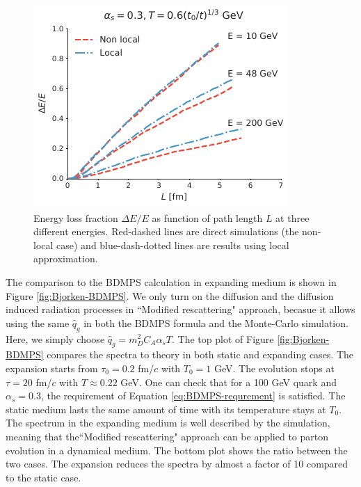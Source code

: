 \documentclass[aps, prc, reprint, amsmath, groupedaddress, nofootinbib]{revtex4-1}
\begin{document}
{\begin{figure}
\includegraphics[width=\columnwidth]{Bjorken.pdf}
\caption{Energy loss fraction $\Delta E /E$ as function of path length $L$ at three different energies. Red-dashed lines are direct simulations (the non-local case) and blue-dash-dotted lines are results using local approximation.}
\label{fig:Bjorken}
\end{figure}


The comparison to the BDMPS calculation in expanding medium is shown in Figure \ref{fig:Bjorken-BDMPS}.
We only turn on the diffusion and the diffusion induced radiation  processes in ``Modified rescattering" approach, becasue it allows using the same $\hat{q}_g$ in both the BDMPS formula and the Monte-Carlo simulation.
Here, we simply choose $\hat{q}_g = m_D^2 C_A\alpha_s T$.
The top plot of Figure \ref{fig:Bjorken-BDMPS} compares the spectra to theory in both static and expanding cases. 
The expansion starts from $\tau_0=0.2$ fm/$c$ with $T_0=1$ GeV. 
The evolution stops at $\tau = 20$ fm/$c$ with $T \approx 0.22$ GeV.
One can check that for a 100 GeV quark and $\alpha_s = 0.3$, the requirement of Equation \ref{eq:BDMPS-requrement} is satisfied.
The static medium lasts the same amount of time with its temperature stays at $T_0$.
The spectrum in the expanding medium is well described by the simulation, meaning that the``Modified rescattering" approach can be applied to parton evolution in a dynamical medium.
The bottom plot shows the ratio between the two cases. 
The expansion reduces the spectra by almost a factor of 10 compared to the static case.

}
\end{document}

